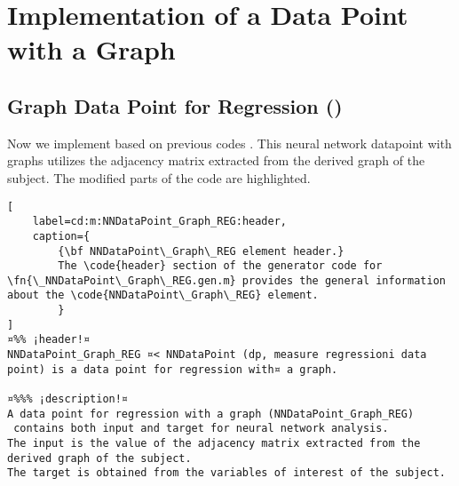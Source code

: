 \documentclass{tufte-handout}
\begin{document}
\clearpage
\section{Implementation of a Data Point with a Graph}
\subsection{Graph Data Point for Regression ()}

Now we implement  based on previous codes .
This neural network datapoint with graphs utilizes the adjacency matrix extracted from the derived graph of the subject. 
The modified parts of the code are highlighted.

\begin{lstlisting}[
	label=cd:m:NNDataPoint_Graph_REG:header,
	caption={
		{\bf NNDataPoint\_Graph\_REG element header.}
		The \code{header} section of the generator code for \fn{\_NNDataPoint\_Graph\_REG.gen.m} provides the general information about the \code{NNDataPoint\_Graph\_REG} element.
		}
]
¤%% ¡header!¤
NNDataPoint_Graph_REG ¤< NNDataPoint (dp, measure regressioni data point) is a data point for regression with¤ a graph.

¤%%% ¡description!¤
A data point for regression with a graph (NNDataPoint_Graph_REG) 
 contains both input and target for neural network analysis.
The input is the value of the adjacency matrix extracted from the derived graph of the subject.
The target is obtained from the variables of interest of the subject.
\end{lstlisting}
\end{document}
